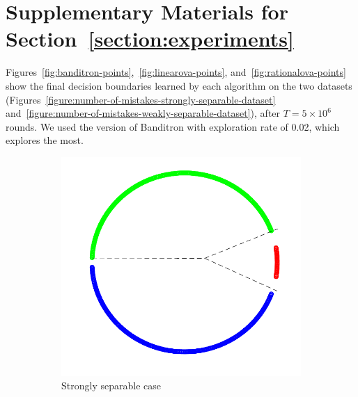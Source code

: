 \section{Supplementary Materials for Section~\ref{section:experiments}}
\label{section:supp-to-experiment}

Figures~\ref{fig:banditron-points},~\ref{fig:linearova-points}, and~\ref{fig:rationalova-points} show the final decision boundaries learned by each algorithm on the two datasets (Figures~\ref{figure:number-of-mistakes-strongly-separable-dataset} and~\ref{figure:number-of-mistakes-weakly-separable-dataset}), 
after $T = 5 \times 10^6$ rounds. We used the version of Banditron
with exploration rate of 0.02, which explores the most.

\begin{figure}[h!]
    \centering
    \begin{subfigure}[b]{0.25\textwidth}
        \captionsetup{justification=centering}
        \begin{center}
        \includegraphics[width=\textwidth, trim={0, 0cm, 0, 0}, clip]{figures/strong_banditron_points}
        \caption{Strongly separable case}
        \end{center}
    \end{subfigure}
    \begin{subfigure}[b]{0.25\textwidth}
        \captionsetup{justification=centering}
        \centering

\end{subfigure}
\end{figure}
